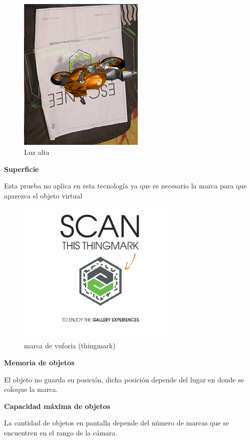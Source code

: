 \begin{figure}[H]
	\begin{minipage}{0.48\textwidth}
		\centering
		\includegraphics[width=6cm]{desarrollo/secciones/pruebas/Vuforia/img/4.png}
		\caption{Luz alta}
		\label{fig:vuforiaLAlta}
	\end{minipage}\hfill
\end{figure}

\textbf{Superficie} \par
Esta prueba no aplica en esta tecnología ya que es necesario la marca para que aparezca el objeto virtual\par

\begin{figure}[H]
	\begin{minipage}{0.48\textwidth}
		\centering
		\includegraphics[width=8cm]{desarrollo/secciones/pruebas/Vuforia/img/12.png}
		\caption{marca de vuforia (thingmark)}
		\label{fig:vuforiaMarca}
	\end{minipage}\hfill
	
\end{figure}


\textbf{Memoria de objetos} \par
El objeto no guarda su posición, dicha posición depende del lugar en donde se coloque la marca.

\textbf{Capacidad máxima de objetos} \par
La cantidad de objetos en pantalla depende del número de marcas que se encuentren en el rango de la cámara.
